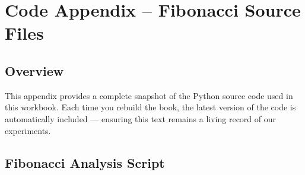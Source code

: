\chapter{Code Appendix – Fibonacci Source Files}

\section{Overview}
This appendix provides a complete snapshot of the Python source code used in this workbook. 
Each time you rebuild the book, the latest version of the code is automatically included — 
ensuring this text remains a living record of our experiments.

\section{Fibonacci Analysis Script}




